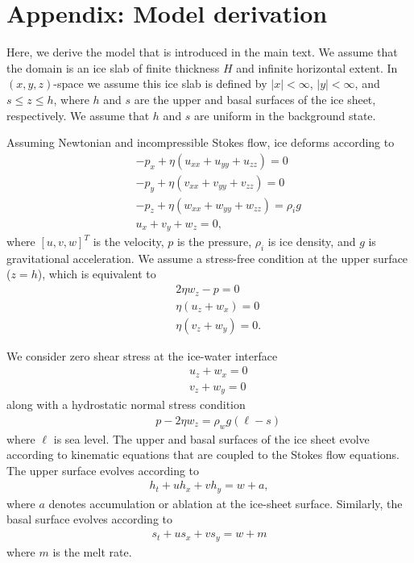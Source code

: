\documentclass[paper=a4, fontsize=11pt]{article} %
\begin{document}
\clearpage

\section{Appendix: Model derivation}
Here, we derive the model that is introduced in the main text.
We assume that the domain is an ice slab of finite thickness $H$ and infinite horizontal extent.
In $(x,y,z)$-space we assume this ice slab is defined by $|x|<\infty$, $|y|<\infty$, and $s\leq z\leq h$, where $h$ and $s$
are the upper and basal surfaces of the ice sheet, respectively.
We assume that $h$ and $s$ are uniform in the background state.

Assuming Newtonian and incompressible Stokes flow, ice deforms according to
\begin{eqnarray}
&&-p_x + \eta ( u_{xx} +u_{yy} + u_{zz}) = 0 \label{stokesbg1} \\
&&-p_y + \eta ( v_{xx}+v_{yy} + v_{zz}) = 0 \\
&&-p_z + \eta ( w_{xx} +w_{yy} + w_{zz}) = \rho_i g \\
&&u_x + v_y + w_z = 0, \label{stokesbg4}
\end{eqnarray}
where $[u,v,w]^T$ is the velocity, $p$ is the pressure, $\rho_i$ is ice density,
and $g$ is gravitational acceleration.
We assume a stress-free condition at the upper surface ($z=h$), which is equivalent to
\begin{eqnarray}
&&2\eta w_z - p = 0 \label{nostress1}\\
&&\eta(u_z +w_x) = 0 \\
&&\eta(v_z +w_y) = 0.\label{nostress3}
\end{eqnarray}

We consider zero shear stress at the ice-water interface
\begin{eqnarray}
&&u_z + w_x = 0 \label{sl1} \\
&&v_z + w_y = 0 \label{sl2}
\end{eqnarray}
along with a hydrostatic normal stress condition
\begin{eqnarray}
&&p-2\eta w_z  = \rho_w g(\ell-s) \label{hydstress}
\end{eqnarray}
where $\ell$ is sea level.
The upper and basal surfaces of the ice sheet evolve according to kinematic
equations that are coupled to the Stokes flow equations.
The upper surface evolves according to
\begin{eqnarray}
h_t + uh_x + vh_y = w+a,
\end{eqnarray}
where $a$ denotes accumulation or ablation at the ice-sheet surface.
Similarly, the basal surface evolves according to
\begin{eqnarray}
s_t + us_x + vs_y  = w + m \label{stbg}
\end{eqnarray}
where $m$ is the melt rate.
\end{document}
